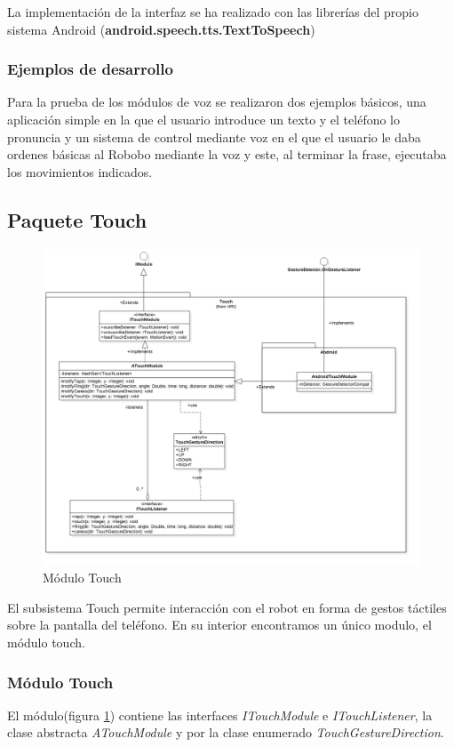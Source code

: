 La implementación de la interfaz se ha realizado con las librerías del propio sistema Android (\textbf{android.speech.tts.TextToSpeech})

\subsubsection*{Ejemplos de desarrollo}

Para la prueba de los módulos de voz se realizaron dos ejemplos básicos, una aplicación simple en la que el usuario introduce un texto y el teléfono lo pronuncia y un sistema de control mediante voz en el que el usuario le daba ordenes básicas al Robobo mediante la voz y este, al terminar la frase, ejecutaba los movimientos indicados.
\newpage
\subsection{Paquete Touch}


\begin{figure}
	\centering
	\includegraphics[width=1\linewidth]{imagenes/diagramas/TouchModule.png}
	\caption{Módulo Touch}
	\label{fig:touch-module}
\end{figure}


El subsistema Touch permite interacción con el robot en forma de gestos táctiles sobre la pantalla del teléfono. En su interior encontramos un único modulo, el módulo touch.
\subsubsection{Módulo Touch}
El módulo(figura \ref{fig:touch-module}) contiene las interfaces \textit{ITouchModule} e \textit{ITouchListener}, la clase abstracta \textit{ATouchModule} y por la clase enumerado \textit{TouchGestureDirection}.

